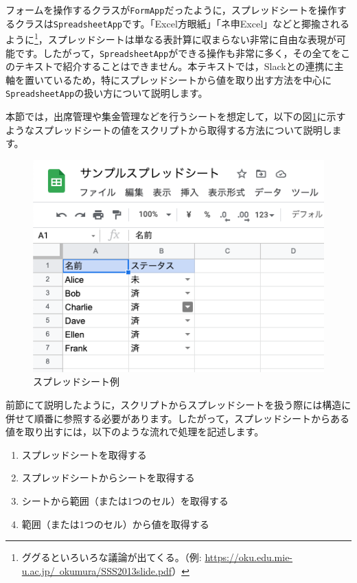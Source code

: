 \documentclass[uplatex,a4j]{jsarticle}
\begin{document}
フォームを操作するクラスが\verb|FormApp|だったように，スプレッドシートを操作するクラスは\verb|SpreadsheetApp|です。「Excel方眼紙」「ネ申Excel」などと揶揄されるように\footnote{ググるといろいろな議論が出てくる。（例: \href{https://oku.edu.mie-u.ac.jp/~okumura/SSS2013slide.pdf}{https://oku.edu.mie-u.ac.jp/~okumura/SSS2013slide.pdf}）}，スプレッドシートは単なる表計算に収まらない非常に自由な表現が可能です。したがって，\verb|SpreadsheetApp|ができる操作も非常に多く，その全てをこのテキストで紹介することはできません。本テキストでは，Slackとの連携に主軸を置いているため，特にスプレッドシートから値を取り出す方法を中心に\verb|SpreadsheetApp|の扱い方について説明します。

本節では，出席管理や集金管理などを行うシートを想定して，以下の図\ref{fig:spreadsheet_sample}に示すようなスプレッドシートの値をスクリプトから取得する方法について説明します。

\begin{figure}[H]
 \centering
 \includegraphics[keepaspectratio, scale=0.7]{images/spreadsheet_sample.png}
 \caption{スプレッドシート例}
 \label{fig:spreadsheet_sample}
\end{figure}

前節にて説明したように，スクリプトからスプレッドシートを扱う際には構造に併せて順番に参照する必要があります。したがって，スプレッドシートからある値を取り出すには，以下のような流れで処理を記述します。

\begin{enumerate}
\item スプレッドシートを取得する
\item スプレッドシートからシートを取得する
\item シートから範囲（または1つのセル）を取得する
\item 範囲（または1つのセル）から値を取得する
\end{enumerate}
\end{document}
